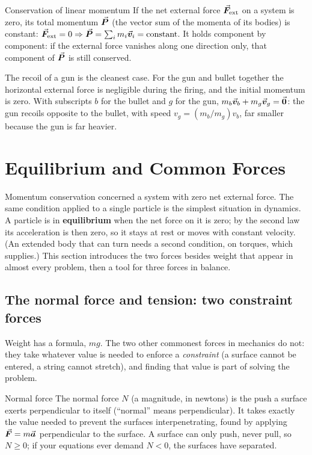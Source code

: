 \begin{keybox}{Conservation of linear momentum}
If the net external force $\vec{\bm{F}}_{\text{ext}}$ on a system is zero, its total momentum $\vec{\bm{P}}$ (the vector
sum of the momenta of its bodies) is constant:
$\vec{\bm{F}}_{\text{ext}}=0\Rightarrow\vec{\bm{P}}=\sum_i m_i\vec{\bm{v}}_i=\text{constant}$. It holds component by component:
if the external force vanishes along one direction only, that component of $\vec{\bm{P}}$ is still conserved.
\end{keybox}

The recoil of a gun is the cleanest case. For the gun and bullet together the horizontal external
force is negligible during the firing, and the initial momentum is zero. With subscripts $b$ for the
bullet and $g$ for the gun, $m_b\vec{\bm{v}}_b+m_g\vec{\bm{v}}_g=\vec{\bm{0}}$: the
gun recoils opposite to the bullet, with speed $v_g=(m_b/m_g)v_b$, far smaller because the gun is far heavier.

\section{Equilibrium and Common Forces}

Momentum conservation concerned a system with zero net external force. The same condition applied to a
single particle is the simplest situation in dynamics. A particle is in \textbf{equilibrium} when the
net force on it is zero; by the second law its acceleration is then zero, so it stays at rest or moves
with constant velocity. (An extended body that can turn needs a second condition, on torques, which
 supplies.) This section introduces the two forces besides weight that appear in
almost every problem, then a tool for three forces in balance.

\subsection{The normal force and tension: two constraint forces}

Weight has a formula, $mg$. The two other commonest forces in mechanics do not: they take whatever value
is needed to enforce a \emph{constraint} (a surface cannot be entered, a string cannot stretch), and
finding that value is part of solving the problem.

\begin{defbox}{Normal force}
The normal force $N$ (a magnitude, in newtons) is the push a surface exerts perpendicular to itself
(``normal'' means perpendicular). It takes exactly the value needed to prevent the surfaces
interpenetrating, found by applying $\vec{\bm{F}}=m\vec{\bm{a}}$ perpendicular to the surface. A surface can only push,
never pull, so $N\ge0$; if your equations ever demand $N<0$, the surfaces have separated.
\end{defbox}

